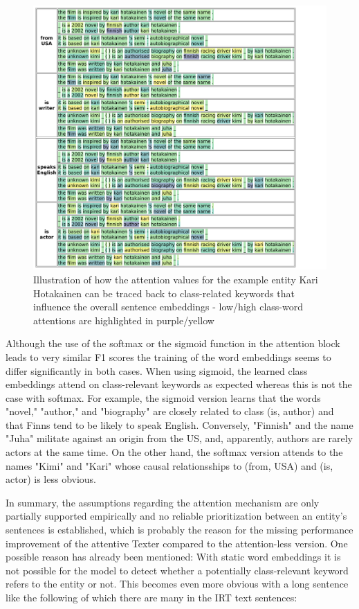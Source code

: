 \begin{figure}
    \centering
    \includegraphics[width=\textwidth]{5_experiments/3_texter/2_static/9_attention/kari_softmax}
    \caption{Illustration of how the attention values for the example entity Kari Hotakainen can be traced back to class-related keywords that influence the overall sentence embeddings - low/high class-word attentions are highlighted in purple/yellow}
    \label{fig:5_experiments/3_texter/2_static/9_attention/kari_softmax}
\end{figure}

Although the use of the softmax or the sigmoid function in the attention block leads to very similar F1 scores the training of the word embeddings seems to differ significantly in both cases. When using sigmoid, the learned class embeddings attend on class-relevant keywords as expected whereas this is not the case with softmax. For example, the sigmoid version learns that the words "novel," "author," and "biography" are closely related to class (is, author) and that Finns tend to be likely to speak English. Conversely, "Finnish" and the name "Juha" militate against an origin from the US, and, apparently, authors are rarely actors at the same time. On the other hand, the softmax version attends to the names "Kimi" and "Kari" whose causal relationsships to (from, USA) and (is, actor) is less obvious.

In summary, the assumptions regarding the attention mechanism are only partially supported empirically and no reliable prioritization between an entity's sentences is established, which is probably the reason for the missing performance improvement of the attentive Texter compared to the attention-less version. One possible reason has already been mentioned: With static word embeddings it is not possible for the model to detect whether a potentially class-relevant keyword refers to the entity or not. This becomes even more obvious with a long sentence like the following of which there are many in the IRT text sentences:

